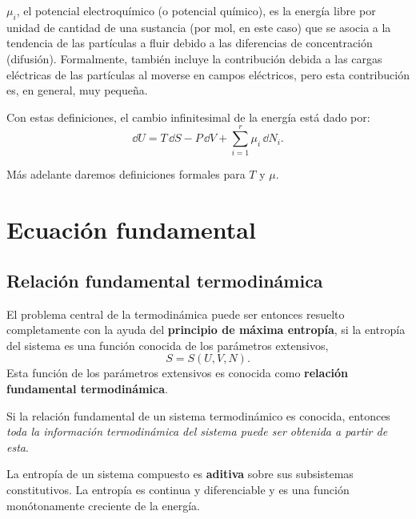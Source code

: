 $\mu_i$, el potencial electroquímico (o potencial químico), es la energía libre por unidad de
cantidad de una sustancia (por mol, en este caso) que se asocia a la tendencia de las partículas a
fluir debido a las diferencias de concentración (difusión). Formalmente, también incluye la
contribución debida a las cargas eléctricas de las partículas al moverse en campos eléctricos, pero
esta contribución es, en general, muy pequeña.

Con estas definiciones, el cambio infinitesimal de la energía está dado por:
\begin{equation*}
  \dd U=T\,\dd S-P\,\dd V+\sum_{i=1}^{r}\mu_i\,\dd N_i.
\end{equation*}

Más adelante daremos definiciones formales para $T$ y $\mu$.

\section{Ecuación fundamental}

\subsection*{Relación fundamental termodinámica}

El problema central de la termodinámica puede ser entonces resuelto completamente con la ayuda del
\textbf{principio de máxima entropía}, si la entropía del sistema es una función conocida de los
parámetros extensivos,
\begin{equation*}
  S=S(U,V,N).
\end{equation*}
Esta función de los parámetros extensivos es conocida como \textbf{relación fundamental
termodinámica}.

Si la relación fundamental de un sistema termodinámico es conocida, entonces \emph{toda la
información termodinámica del sistema puede ser obtenida a partir de esta}.

\begin{postulado}[III]
  La entropía de un sistema compuesto es \textbf{aditiva} sobre sus subsistemas constitutivos. La
  entropía es continua y diferenciable y es una función monótonamente creciente de la energía.
\end{postulado}

